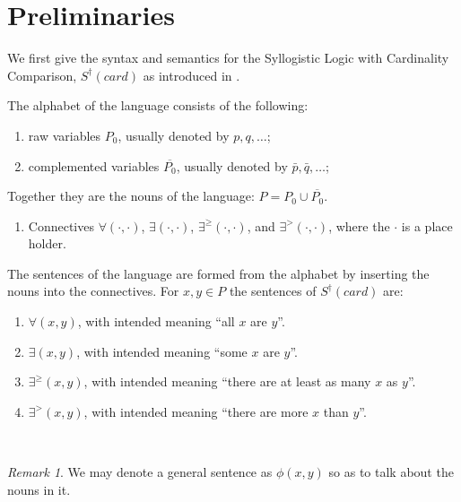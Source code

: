 \documentclass[12pt, reqno]{amsart}
\theoremstyle{definition}
\theoremstyle{remark}
\newtheorem{remark}[theorem]{Remark}
\numberwithin{equation}{section}
\begin{document}

\newpage

\section{Preliminaries}

We first give the syntax and semantics for the Syllogistic Logic with Cardinality Comparison, $S^{\dagger}(card)$ as introduced in \cite{Larry}. 

The alphabet of the language consists of the following: 
\begin{enumerate}
\item raw variables $P_0$, usually denoted by $p, q, \dots$; 
\item complemented variables $\overline{P_0}$, usually denoted by $\bar{p}, \bar{q}, \dots$;
\end{enumerate}
Together they are the nouns of the language: $P = P_0 \cup \overline{P_0}$. 
\begin{enumerate}
\item[(3)] Connectives $\forall(\cdot,\cdot)$, $\exists(\cdot,\cdot)$, $\exists^{\geq}(\cdot,\cdot)$, and $\exists^{>}(\cdot,\cdot)$, where the $\cdot$ is a place holder. 
\end{enumerate}

The sentences of the language are formed from the alphabet by inserting the nouns into the connectives.  For $x, y \in P$ the sentences of $S^{\dagger}(card)$ are:
\begin{enumerate}
\item $\forall(x, y)$, with intended meaning ``all $x$ are $y$''. 
\item $\exists(x, y)$, with intended meaning ``some $x$ are $y$''. 
\item $\exists^{\geq}(x, y)$, with intended meaning ``there are at least as many $x$ as $y$''. 
\item $\exists^{>}(x, y)$, with intended meaning ``there are more $x$ than $y$''. 
\end{enumerate}
\hfill \\ 

\begin{remark}
	We may denote a general sentence as $\phi(x, y)$ so as to talk about the nouns in it. 
\end{remark}
\end{document}
